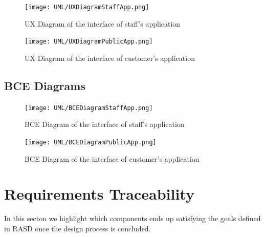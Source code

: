 \documentclass[11pt]{article} %
\begin{document}
\begin{figure}[H]
	\centering
	\texttt{[image: UML/UXDiagramStaffApp.png]}
	\caption{UX Diagram of the interface of staff's application}
\end{figure}	

\begin{figure}[H]
	\centering
	\texttt{[image: UML/UXDiagramPublicApp.png]}
	\caption{UX Diagram of the interface of customer's application}
\end{figure}

\subsection{BCE Diagrams}

\begin{figure}[H]
	\centering
	\texttt{[image: UML/BCEDiagramStaffApp.png]}
	\caption{BCE Diagram of the interface of staff's application}
\end{figure}	
	
\begin{figure}[H]
	\centering
	\texttt{[image: UML/BCEDiagramPublicApp.png]}
	\caption{BCE Diagram of the interface of customer's application}
\end{figure}	




\newpage
\section{Requirements Traceability}

In this secton we highlight which components ends up satisfying the goals defined in RASD once the design process is concluded.
\end{document}
